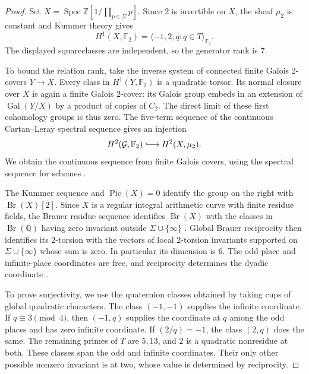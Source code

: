 \begin{proof}
Set $X=\operatorname{Spec}\mathbb Z[1/\prod_{p\in\Sigma}p]$.
Since $2$ is invertible on $X$, the sheaf $\mu_2$ is constant and Kummer
theory gives
\[
 H^1(X,\mathbb F_2)=
 \langle-1,2,q:q\in T\rangle_{\mathbb F_2}.
\]
The displayed squareclasses are independent, so the generator rank is $7$.

To bound the relation rank, take the inverse system of connected finite
Galois $2$-covers $Y\to X$.
Every class in $H^1(Y,\mathbb F_2)$ is a quadratic torsor.  Its normal
closure over $X$ is again a finite Galois $2$-cover: its Galois group embeds
in an extension of $\operatorname{Gal}(Y/X)$ by a product of copies of
$C_2$.  The direct limit of these first cohomology groups is thus zero. The
five-term sequence of the continuous Cartan--Leray spectral sequence
gives an injection
\begin{equation}\label{tw:global-h2-injection}
 H^2(\mathcal G,\mathbb F_2)
 \lhook\joinrel\longrightarrow H^2(X,\mu_2).
\end{equation}
We obtain the continuous sequence from finite Galois covers, using
the spectral sequence for schemes
\cite[Theorem~14.9]{MilneEtale}.

The Kummer sequence and $\operatorname{Pic}(X)=0$ identify the group on the
right with $\operatorname{Br}(X)[2]$.  Since $X$ is a regular integral
arithmetic curve with finite residue fields, the Brauer residue sequence
identifies $\operatorname{Br}(X)$ with the classes in
$\operatorname{Br}(\mathbb Q)$ having zero invariant outside
$\Sigma\cup\{\infty\}$ \cite[Theorem~6.8.3 and
Example~6.9.4]{Poonen}. Global Brauer reciprocity then identifies its
$2$-torsion with the vectors of local $2$-torsion invariants supported
on $\Sigma\cup\{\infty\}$ whose sum is zero.  In particular its dimension
is $6$. The odd-place and infinite-place coordinates are free, and
reciprocity determines the dyadic coordinate
\cite[Chapter~IV, Example~2.14(e)]{MilneCFT}.

To prove surjectivity, we use the quaternion classes obtained by taking
cups of global quadratic characters.
The class $(-1,-1)$ supplies the infinite coordinate.  If $q\equiv3\pmod4$,
then $(-1,q)$ supplies the coordinate at $q$ among the odd places and
has zero infinite coordinate.  If $(2/q)=-1$, the class $(2,q)$ does the
same.  The remaining primes of $T$ are $5,13$, and $2$ is a quadratic
nonresidue at both. These classes span the odd and infinite coordinates. Their only other
possible nonzero invariant is at two, whose value is determined by
reciprocity.


\end{proof}
